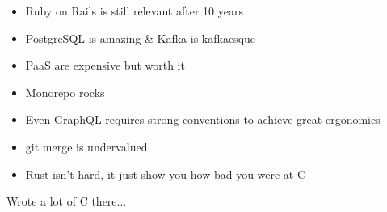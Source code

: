 \documentclass[10pt,a4paper,ragged2e,withhyper]{altacv}
\begin{document}
\begin{paracol}{2}
\begin{itemize}
  \item Ruby on Rails is still relevant after 10 years
  \item PostgreSQL is amazing \& Kafka is kafkaesque
  \item PaaS are expensive but worth it
  \item Monorepo rocks
  \item Even GraphQL requires strong conventions to achieve great ergonomics
  \item git merge is undervalued
  \item Rust isn't hard, it just show you how bad you were at C
\end{itemize}


Wrote a lot of C there...

\divider


\newpage



\divider


\end{paracol}
\end{document}
